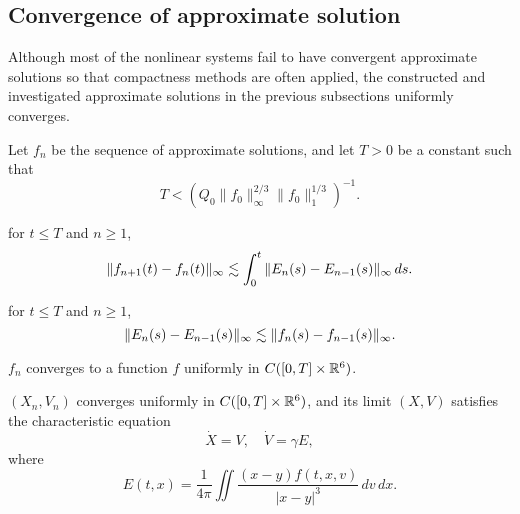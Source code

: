 \documentclass[11pt]{amsart}
\begin{document}
\subsection{Convergence of approximate solution}
Although most of the nonlinear systems fail to have convergent approximate solutions so that compactness methods are often applied, the constructed and investigated approximate solutions in the previous subsections uniformly converges.
\begin{lem}
Let $f_n$ be the sequence of approximate solutions, and let $T>0$ be a constant such that
\[T<(Q_0\|f_0\|_\infty^{2/3}\|f_0\|_1^{1/3})^{-1}.\]
\begin{cond}
\item
for $t\le T$ and $n\ge1$,
\[\|f_{n+1}(t)-f_n(t)\|_\infty\lesssim\int_0^t\|E_n(s)-E_{n-1}(s)\|_\infty\,ds.\]
\item
for $t\le T$ and $n\ge1$,
\[\|E_n(s)-E_{n-1}(s)\|_\infty\lesssim\|f_n(s)-f_{n-1}(s)\|_\infty.\]
\item $f_n$ converges to a function $f$ uniformly in $C([0,T]\times\mathbb{R}^6)$.
\item $(X_n,V_n)$ converges uniformly in $C([0,T]\times\mathbb{R}^6)$, and its limit $(X,V)$ satisfies the characteristic equation
\[\dot X=V,\quad\dot V=\gamma E,\]
where
\[E(t,x)=\frac1{4\pi}\iint\frac{(x-y)f(t,x,v)}{|x-y|^3}\,dv\,dx.\]
\end{cond}
\end{lem}
\end{document}
